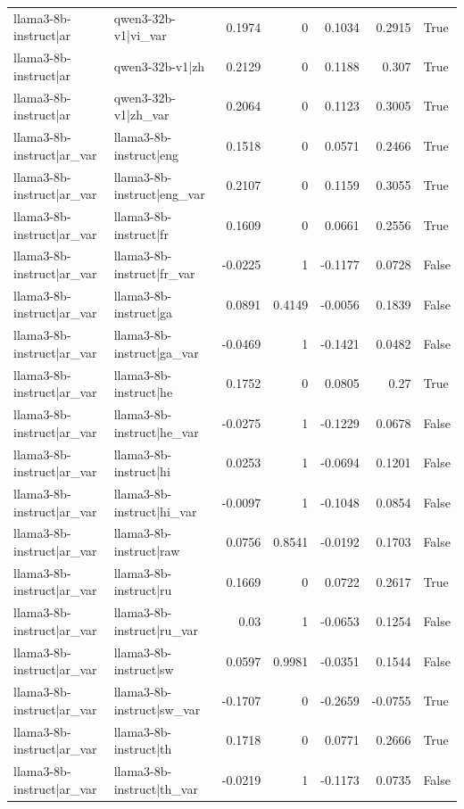 \begin{table}
\begin{tabular}{l l r r r r l}
llama3-8b-instruct|ar & qwen3-32b-v1|vi_var & 0.1974 & 0 & 0.1034 & 0.2915 & True \\
llama3-8b-instruct|ar & qwen3-32b-v1|zh & 0.2129 & 0 & 0.1188 & 0.307 & True \\
llama3-8b-instruct|ar & qwen3-32b-v1|zh_var & 0.2064 & 0 & 0.1123 & 0.3005 & True \\
llama3-8b-instruct|ar_var & llama3-8b-instruct|eng & 0.1518 & 0 & 0.0571 & 0.2466 & True \\
llama3-8b-instruct|ar_var & llama3-8b-instruct|eng_var & 0.2107 & 0 & 0.1159 & 0.3055 & True \\
llama3-8b-instruct|ar_var & llama3-8b-instruct|fr & 0.1609 & 0 & 0.0661 & 0.2556 & True \\
llama3-8b-instruct|ar_var & llama3-8b-instruct|fr_var & -0.0225 & 1 & -0.1177 & 0.0728 & False \\
llama3-8b-instruct|ar_var & llama3-8b-instruct|ga & 0.0891 & 0.4149 & -0.0056 & 0.1839 & False \\
llama3-8b-instruct|ar_var & llama3-8b-instruct|ga_var & -0.0469 & 1 & -0.1421 & 0.0482 & False \\
llama3-8b-instruct|ar_var & llama3-8b-instruct|he & 0.1752 & 0 & 0.0805 & 0.27 & True \\
llama3-8b-instruct|ar_var & llama3-8b-instruct|he_var & -0.0275 & 1 & -0.1229 & 0.0678 & False \\
llama3-8b-instruct|ar_var & llama3-8b-instruct|hi & 0.0253 & 1 & -0.0694 & 0.1201 & False \\
llama3-8b-instruct|ar_var & llama3-8b-instruct|hi_var & -0.0097 & 1 & -0.1048 & 0.0854 & False \\
llama3-8b-instruct|ar_var & llama3-8b-instruct|raw & 0.0756 & 0.8541 & -0.0192 & 0.1703 & False \\
llama3-8b-instruct|ar_var & llama3-8b-instruct|ru & 0.1669 & 0 & 0.0722 & 0.2617 & True \\
llama3-8b-instruct|ar_var & llama3-8b-instruct|ru_var & 0.03 & 1 & -0.0653 & 0.1254 & False \\
llama3-8b-instruct|ar_var & llama3-8b-instruct|sw & 0.0597 & 0.9981 & -0.0351 & 0.1544 & False \\
llama3-8b-instruct|ar_var & llama3-8b-instruct|sw_var & -0.1707 & 0 & -0.2659 & -0.0755 & True \\
llama3-8b-instruct|ar_var & llama3-8b-instruct|th & 0.1718 & 0 & 0.0771 & 0.2666 & True \\
llama3-8b-instruct|ar_var & llama3-8b-instruct|th_var & -0.0219 & 1 & -0.1173 & 0.0735 & False \\

\end{tabular}
\end{table}
